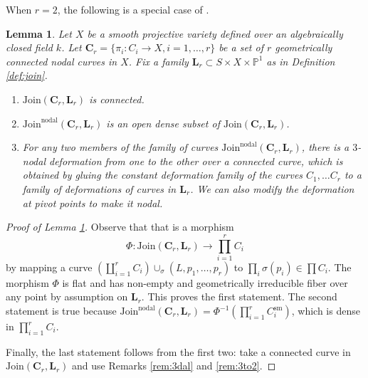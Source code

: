 \documentclass{amsart}
\newtheorem{lem}[theorem]{Lemma}
\theoremstyle{definition}
\theoremstyle{remark}
\newcommand{\mbb}{\mathbb}
\newcommand{\PP}{\mbb{P}}
\newcommand{\sm}{\text{sm}}
\begin{document}
When $r=2$, the following is a special case of \cite[Corollary 31]{Kollar_Tian}.
\begin{lem}\label{lem:deform}
    Let $X$ be a smooth projective variety defined over an algebraically closed field $k$. 
    Let $\mathbf{C}_r=\{\pi_i:C_i \to X, i=1, \ldots, r\} $ be a set of $r$ geometrically connected nodal curves in $X$. 
    Fix a family $\mathbf{L}_r\subset S \times X\times \PP^1$ as in Definition  \ref{def:join}. 
    \begin{enumerate}
        \item $\text{Join}(\mathbf{C}_r, \mathbf{L}_r)$ is connected.
        \item $\text{Join}^\text{nodal}(\mathbf{C}_r, \mathbf{L}_r)$ is an open dense subset of $\text{Join}(\mathbf{C}_r, \mathbf{L}_r)$.
        
        \item For any two members of the family of curves $\text{Join}^{\text{nodal}}(\mathbf{C}_r, \mathbf{L}_r)$, there is a $3$-nodal deformation from one to the other over a connected curve, which is obtained by gluing the constant deformation family of the curves $C_1, \ldots C_r$ to a family of deformations of curves in $\mathbf{L}_r$.
        We can also modify the deformation at pivot points to make it nodal.
    \end{enumerate}
\end{lem}

\begin{proof}[Proof of Lemma \ref{lem:deform}]
    Observe that that is a morphism $$\Phi: \text{Join}(\textbf{C}_r, \mathbf{L}_r)\to \prod_{i=1}^rC_i$$ by mapping a curve $(\coprod_{i=1}^r C_i) \cup_{\sigma} (L, p_1, \ldots, p_r)$ to $\prod_i \sigma(p_i) \in \prod C_i$. 
    The morphism $\Phi$ is flat and has non-empty and geometrically irreducible fiber over any point by assumption on $\mathbf{L}_r$. This proves the first statement.
    The second statement is true because  $\text{Join}^{\text{nodal}}(\mathbf{C}_r, \mathbf{L}_r)=\Phi^{-1}(\prod_{i=1}^rC_i^\sm)$, which is dense in $\prod_{i=1}^rC_i$.
    

    Finally, the last statement follows from the first two: take a connected curve in $\text{Join}(\mathbf{C}_r, \mathbf{L}_r)$ and use Remarks \ref{rem:3dal} and  \ref{rem:3to2}. 
\end{proof}
\end{document}
